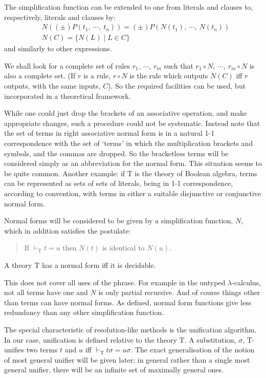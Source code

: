 \documentclass[letterpaper]{report}
\begin{document}
The simplification function can be extended to one from literals and
clauses to, respectively, literals and clauses by:
\begin{align*}
	&N((\pm)P(t_{1},\ \cdots,\ t_{n})) = (\pm)P(N(t_{1}),\ \cdots,\ N(t_{n}))\\
	&N(C)=\{N(L)\mid L\in C\}
\end{align*}
and similarly to other expressions.

We shall look for a complete set of rules $r_{1},\ \cdots,\ r_{m}$
such that $r_{1}\circ N,\ \cdots,\ r_{m}\circ N$ is also a complete
set. (If $r$ is a rule, $r\circ N$ is the rule which outputs
$N(C)$ iff $r$ outputs, with the same inputs, $C$). So the
required facilities can be used, but incorporated in a theoretical
framework.

While one could just drop the brackets of an associative operation, and
make appropriate changes, such a procedure could not be systematic.
Instead note that the set of terms in right associative normal form is
in a natural 1-1 correspondence with the set of
`terms' in which the multiplication
brackets and symbols, and the commas are dropped. So the bracketless
terms will be considered simply as an abbreviation for the normal form.
This situation seems to be quite common. Another example: if $\mathrm{T}$ is
the theory of Boolean algebra, terms can be represented as sets of sets
of literals, being in 1-1 correspondence, according to convention, with
terms in either a suitable disjunctive or conjunctive normal form.

Normal forms will be considered to be given by a simplification
function, $N$, which in addition satisfies the postulate:

\begin{quote}
If $\vdash_{\mathrm{T}}t=u$ then $N(t)$ is identical to
$N(u)$.
\end{quote}


A theory $\mathrm{T}$ has a normal form iff it is decidable.

This does not cover all uses of the phrase. For example in the untyped
$\lambda$-calculus, not all terms have one and $N$ is only partial
recursive. And of course things other than terms can have normal forms.
As defined, normal form functions give less redundancy than any other
simplification function.

The special characteristic of resolution-like methods is the unification
algorithm. In our case, unification is defined relative to the theory
$\mathrm{T}$. A substitution, $\sigma$, $\mathrm{T}$-unifies two terms $t$ and
$u$ iff $\vdash_{\mathrm{T}}t\sigma=u\sigma$. The exact
generalisation of the notion of most general unifier will be given
later; in general rather than a single most general unifier, there will
be an infinite set of maximally general ones.
\end{document}
